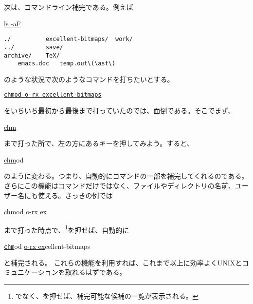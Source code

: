 次は、コマンドライン補完である。例えば
\begin{commandline2}
    \prompt \underline{ls -aF}
    \begin{verbatim}
./          excellent-bitmaps/  work/
../         save/
archive/    TeX/
    emacs.doc   temp.out\(\ast\)
\end{verbatim}
\end{commandline2} \noindent
のような状況で次のようなコマンドを打ちたいとする。
\begin{commandline2}
    \prompt \underline{\texttt{chmod o-rx excellent-bitmaps}}
\end{commandline2} \noindent
をいちいち最初から最後まで打っていたのでは、面倒である。そこでまず、
\begin{commandline2}
    \prompt \underline{chm}
\end{commandline2} \noindent
まで打った所で、左の方にあるキーを押してみよう。すると、
\begin{commandline2}
    \prompt \underline{chm}od\ \cursor
\end{commandline2} \noindent
のように変わる。つまり、自動的にコマンドの一部を補完してくれるのである。さらにこの機能はコマンドだけではなく、ファイルやディレクトリの名前、ユーザー名にも使える。さっきの例では
\begin{commandline2}
    \prompt \underline{chm}od \underline{o-rx ex}
\end{commandline2} \noindent
まで打った時点で、\footnote{でなく、を押せば、補完可能な候補の一覧が表示される。}を押せば、自動的に
\begin{commandline2}
    \prompt \underline{\texttt{chm}}od \underline{o-rx ex}cellent-bitmaps
\end{commandline2} \noindent
と補完される。
これらの機能を利用すれば、これまで以上に効率よくUNIXとコミュニケーションを取れるはずである。

